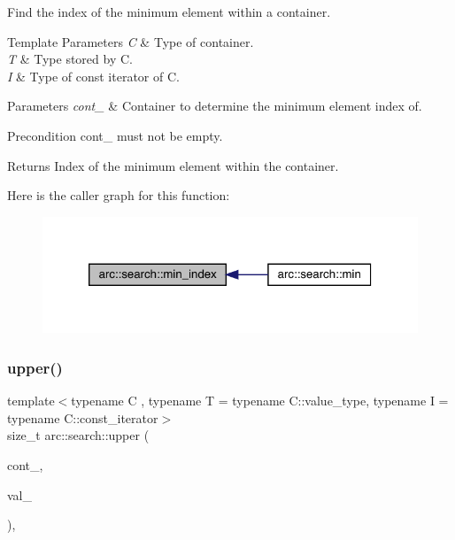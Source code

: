 Find the index of the minimum element within a container.


\begin{DoxyTemplParams}{Template Parameters}
{\em C} & Type of container. \\
\hline
{\em T} & Type stored by C. \\
\hline
{\em I} & Type of const iterator of C.\\
\hline
\end{DoxyTemplParams}

\begin{DoxyParams}{Parameters}
{\em cont\+\_\+} & Container to determine the minimum element index of.\\
\hline
\end{DoxyParams}
\begin{DoxyPrecond}{Precondition}
cont\+\_\+ must not be empty.
\end{DoxyPrecond}
\begin{DoxyReturn}{Returns}
Index of the minimum element within the container. 
\end{DoxyReturn}
Here is the caller graph for this function\+:\nopagebreak
\begin{figure}[H]
\begin{center}
\leavevmode
\includegraphics[width=320pt]{namespacearc_1_1search_ae457da2cc210e1edfaf811bc83154f4b_icgraph}
\end{center}
\end{figure}
\mbox{\label{namespacearc_1_1search_a66f5d701ff409cb5e2673a4d5864cd11}} 
\subsubsection{\texorpdfstring{upper()}{upper()}}
{\footnotesize\ttfamily template$<$typename C , typename T  = typename C\+::value\+\_\+type, typename I  = typename C\+::const\+\_\+iterator$>$ \\
size\+\_\+t arc\+::search\+::upper (\begin{DoxyParamCaption}\item[{const C \&}]{cont\+\_\+,  }\item[{const T \&}]{val\+\_\+ }\end{DoxyParamCaption})\hspace{0.3cm}{\ttfamily [inline]}, {\ttfamily [noexcept]}}

